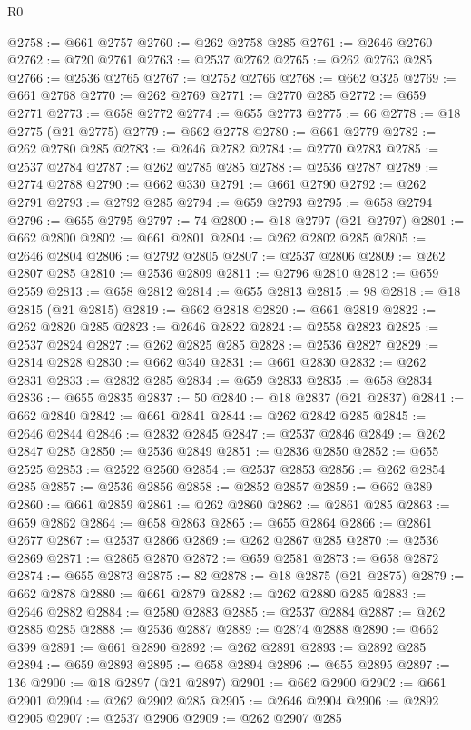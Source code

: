\begin{lexlean}{R0}
\begin{coremodule}
@2758 := @661 @2757
@2760 := @262 @2758 @285
@2761 := @2646 @2760
@2762 := @720 @2761
@2763 := @2537 @2762
@2765 := @262 @2763 @285
@2766 := @2536 @2765
@2767 := @2752 @2766
@2768 := @662 @325
@2769 := @661 @2768
@2770 := @262 @2769
@2771 := @2770 @285
@2772 := @659 @2771
@2773 := @658 @2772
@2774 := @655 @2773
@2775 := 66
@2778 := @18 @2775 (@21 @2775)
@2779 := @662 @2778
@2780 := @661 @2779
@2782 := @262 @2780 @285
@2783 := @2646 @2782
@2784 := @2770 @2783
@2785 := @2537 @2784
@2787 := @262 @2785 @285
@2788 := @2536 @2787
@2789 := @2774 @2788
@2790 := @662 @330
@2791 := @661 @2790
@2792 := @262 @2791
@2793 := @2792 @285
@2794 := @659 @2793
@2795 := @658 @2794
@2796 := @655 @2795
@2797 := 74
@2800 := @18 @2797 (@21 @2797)
@2801 := @662 @2800
@2802 := @661 @2801
@2804 := @262 @2802 @285
@2805 := @2646 @2804
@2806 := @2792 @2805
@2807 := @2537 @2806
@2809 := @262 @2807 @285
@2810 := @2536 @2809
@2811 := @2796 @2810
@2812 := @659 @2559
@2813 := @658 @2812
@2814 := @655 @2813
@2815 := 98
@2818 := @18 @2815 (@21 @2815)
@2819 := @662 @2818
@2820 := @661 @2819
@2822 := @262 @2820 @285
@2823 := @2646 @2822
@2824 := @2558 @2823
@2825 := @2537 @2824
@2827 := @262 @2825 @285
@2828 := @2536 @2827
@2829 := @2814 @2828
@2830 := @662 @340
@2831 := @661 @2830
@2832 := @262 @2831
@2833 := @2832 @285
@2834 := @659 @2833
@2835 := @658 @2834
@2836 := @655 @2835
@2837 := 50
@2840 := @18 @2837 (@21 @2837)
@2841 := @662 @2840
@2842 := @661 @2841
@2844 := @262 @2842 @285
@2845 := @2646 @2844
@2846 := @2832 @2845
@2847 := @2537 @2846
@2849 := @262 @2847 @285
@2850 := @2536 @2849
@2851 := @2836 @2850
@2852 := @655 @2525
@2853 := @2522 @2560
@2854 := @2537 @2853
@2856 := @262 @2854 @285
@2857 := @2536 @2856
@2858 := @2852 @2857
@2859 := @662 @389
@2860 := @661 @2859
@2861 := @262 @2860
@2862 := @2861 @285
@2863 := @659 @2862
@2864 := @658 @2863
@2865 := @655 @2864
@2866 := @2861 @2677
@2867 := @2537 @2866
@2869 := @262 @2867 @285
@2870 := @2536 @2869
@2871 := @2865 @2870
@2872 := @659 @2581
@2873 := @658 @2872
@2874 := @655 @2873
@2875 := 82
@2878 := @18 @2875 (@21 @2875)
@2879 := @662 @2878
@2880 := @661 @2879
@2882 := @262 @2880 @285
@2883 := @2646 @2882
@2884 := @2580 @2883
@2885 := @2537 @2884
@2887 := @262 @2885 @285
@2888 := @2536 @2887
@2889 := @2874 @2888
@2890 := @662 @399
@2891 := @661 @2890
@2892 := @262 @2891
@2893 := @2892 @285
@2894 := @659 @2893
@2895 := @658 @2894
@2896 := @655 @2895
@2897 := 136
@2900 := @18 @2897 (@21 @2897)
@2901 := @662 @2900
@2902 := @661 @2901
@2904 := @262 @2902 @285
@2905 := @2646 @2904
@2906 := @2892 @2905
@2907 := @2537 @2906
@2909 := @262 @2907 @285

\end{coremodule}
\end{lexlean}
